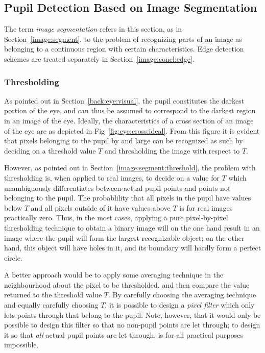 \subsection{Pupil Detection Based on Image Segmentation}
\label{image:concl:segment}

The term {\em image segmentation\/} refers in this section, as in
Section~\ref{image:segment}, to the problem of recognizing parts of an
image as belonging to a continuous region with certain
characteristics.  Edge detection schemes are treated separately in
Section~\ref{image:concl:edge}.

\subsubsection{Thresholding}

As pointed out in Section~\ref{back:eye:visual}, the pupil constitutes
the darkest portion of the eye, and can thus be assumed to correspond
to the darkest region in an image of the eye.  Ideally, the
characteristics of a cross section of an image of the eye are as
depicted in Fig~\ref{fig:eye:cross:ideal}.  From this figure it is
evident that pixels belonging to the pupil by and large can be
recognized as such by deciding on a threshold value $T$ and
thresholding the image with respect to $T$.  


However, as pointed out in Section~\ref{image:segment:threshold}, the
problem with thresholding is, when applied to real images, to decide
on a value for $T$ which unambiguously differentiates between actual
pupil points and points not belonging to the pupil.  The probablility
that all pixels in the pupil have values below $T$ and all pixels
outside of it have values above $T$ is for real images practically
zero.  Thus, in the most cases, applying a pure pixel-by-pixel
thresholding technique to obtain a binary image will on the one hand
result in an image where the pupil will form the largest recognizable
object; on the other hand, this object will have holes in it, and its
boundary will hardly form a perfect circle.

A better approach would be to apply some averaging technique in the
neighbourhood about the pixel to be thresholded, and then compare the
value returned to the threshold value $T$.  By carefully choosing the
averaging technique and equally carefully choosing $T$, it is possible
to design a {\em pixel filter\/} which only lets points through that
belong to the pupil.  Note, however, that it would only be possible to
design this filter so that no non-pupil points are let through; to
design it so that {\em all\/} actual pupil points are let through, is
for all practical purposes impossible.


